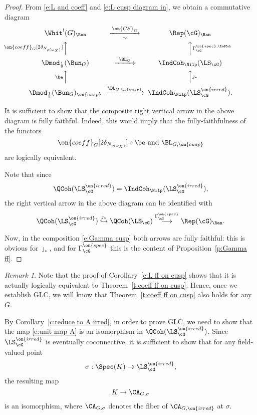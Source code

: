 \documentclass[9pt]{amsart}
\theoremstyle{remark}
\newtheorem{rem}[subsubsection]{Remark}
\theoremstyle{definition}
\theoremstyle{remark}
\newcommand{\thmref}[1]{Theorem~\ref{#1}}
\newcommand{\propref}[1]{Proposition~\ref{#1}}
\newcommand{\corref}[1]{Corollary~\ref{#1}}
\numberwithin{equation}{section}
\begin{document}
\begin{proof}

From \eqref{e:L and coeff} and  \eqref{e:L cusp diagram in}, we obtain a commutative diagram
$$
\CD
\Whit^!(G)_\Ran @>{\on{CS}_G}>{\sim}>  \Rep(\cG)_\Ran \\
@A{\on{coeff}_G}[2\delta_{N_{\rho(\omega_X)}}]AA @AA{\Gamma^{\on{spec},\IndCoh}_\cG}A \\
\Dmod_{\frac{1}{2}}(\Bun_G) @>{\BL_G}>>  \IndCoh_\Nilp(\LS_\cG) \\
@A{\be}AA @AA{\jmath_*}A \\
\Dmod_{\frac{1}{2}}(\Bun_G)_{\on{cusp}} @>{\BL_{G,\on{cusp}}}>> \IndCoh_\Nilp(\LS^{\on{irred}}_\cG).
\endCD
$$

\medskip

It is sufficient to show that the composite right vertical arrow in the above diagram is fully faithful. Indeed,
this would imply that the fully-faithfulness of the functors
$$\on{coeff}_G[2\delta_{N_{\rho(\omega_X)}}] \circ \be \text{ and } \BL_{G,\on{cusp}}$$
are logically equivalent. 

\medskip

Note that since 
$$\QCoh(\LS^{\on{irred}}_\cG)=\IndCoh_\Nilp(\LS^{\on{irred}}_\cG),$$
the right vertical arrow in the above diagram can be identified with
\begin{equation} \label{e:Gamma cusp}
\QCoh(\LS^{\on{irred}}_\cG) \overset{\jmath_*}\hookrightarrow 
\QCoh(\LS_\cG)\overset{\Gamma^{\on{spec}}_\cG}\longrightarrow  \Rep(\cG)_\Ran.
\end{equation}

Now, in the composition \eqref{e:Gamma cusp} both arrows are fully faithful: this is obvious for
$\jmath_*$, and for $\Gamma^{\on{spec}}_\cG$ this is the content of \propref{p:Gamma ff}.

\end{proof}

\begin{rem}
Note that the proof of \corref{c:L ff on cusp} shows that it is actually logically equivalent to
\thmref{t:coeff ff on cusp}.  Hence, once we establish GLC, we will know that 
\thmref{t:coeff ff on cusp} also holds for any $G$.
\end{rem}

\sssec{}

By \corref{c:reduce to A irred}, in order to prove GLC, we need to show that the map \eqref{e:unit map A}
is an isomorphism in $\QCoh(\LS^{\on{irred}}_\cG)$. Since $\LS^{\on{irred}}_\cG$ is eventually 
coconnective, it is sufficient to show that for any field-valued point
$$\sigma:\Spec(K)\to \LS^{\on{irred}}_\cG,$$
the resulting map
\begin{equation} \label{e:unit map A sigma}
K\to \CA_{G,\sigma}
\end{equation}
is an isomorphism, where $\CA_{G,\sigma}$ denotes the fiber of $\CA_{G,\on{irred}}$ at $\sigma$.
\end{document}
